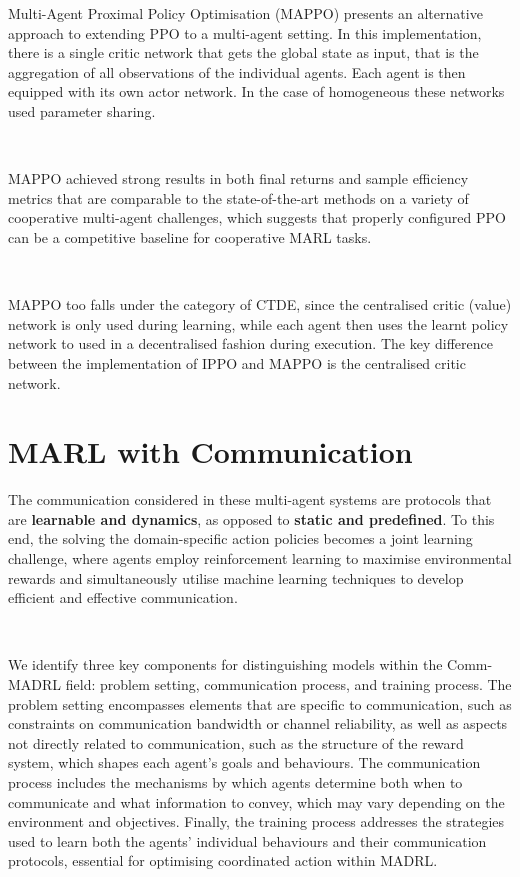\documentclass{article}
\begin{document}
Multi-Agent Proximal Policy Optimisation (MAPPO) \citep{chao2021surprising} presents an alternative approach to extending PPO to a multi-agent setting. In this implementation, there is a single critic network that gets the global state as input, that is the aggregation of all observations of the individual agents. Each agent is then equipped with its own actor network. In the case of homogeneous these networks used parameter sharing.

\

MAPPO achieved strong results in both final returns and sample efficiency metrics that are comparable to the state-of-the-art methods on a variety of cooperative multi-agent challenges, which suggests that properly configured PPO can be a competitive baseline for cooperative MARL tasks. \citep{chao2021surprising}

\

MAPPO too falls under the category of CTDE, since the centralised critic (value) network is only used during learning, while each agent then uses the learnt policy network to used in a decentralised fashion during execution. The key difference between the implementation of IPPO and MAPPO is the centralised critic network.

\newpage

\section{MARL with Communication}


The communication considered in these multi-agent systems are protocols that are \textbf{learnable and dynamics}, as opposed to \textbf{static and predefined}. To this end, the solving the domain-specific action policies becomes a joint learning challenge, where agents employ reinforcement learning to maximise environmental rewards and simultaneously utilise machine learning techniques to develop efficient and effective communication. \citep{zhu2024survey}

\

We identify three key components for distinguishing models within the Comm-MADRL field: problem setting, communication process, and training process. The problem setting encompasses elements that are specific to communication, such as constraints on communication bandwidth or channel reliability, as well as aspects not directly related to communication, such as the structure of the reward system, which shapes each agent's goals and behaviours. The communication process includes the mechanisms by which agents determine both when to communicate and what information to convey, which may vary depending on the environment and objectives. Finally, the training process addresses the strategies used to learn both the agents' individual behaviours and their communication protocols, essential for optimising coordinated action within MADRL.
\end{document}
